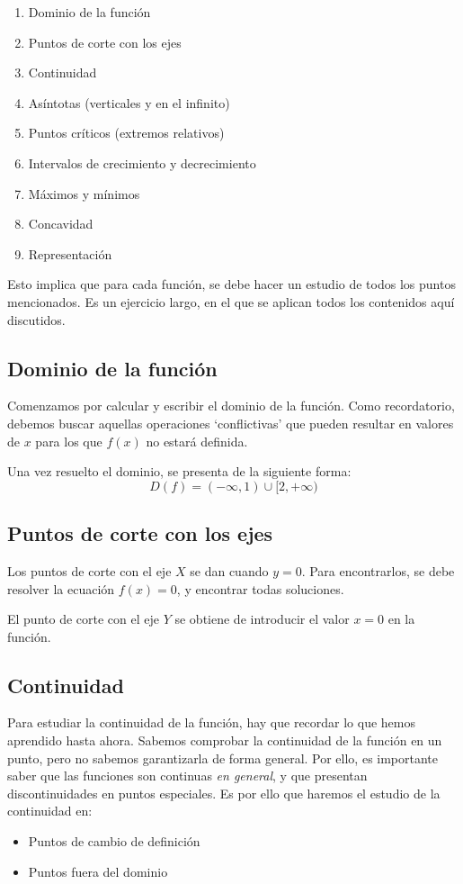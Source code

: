 \documentclass[sans]{apuntes}
\begin{document}
\begin{enumerate}
	\item Dominio de la función
	\item Puntos de corte con los ejes
	\item Continuidad
	\item Asíntotas (verticales y en el infinito)
	\item Puntos críticos (extremos relativos)
	\item Intervalos de crecimiento y decrecimiento
	\item Máximos y mínimos
	\item Concavidad
	\item Representación
\end{enumerate}

Esto implica que para cada función, se debe hacer un estudio de todos los puntos mencionados. Es un ejercicio largo, en el que se aplican todos los contenidos aquí discutidos.

\subsection{Dominio de la función}
Comenzamos por calcular y escribir el dominio de la función. Como recordatorio, debemos buscar aquellas operaciones `conflictivas' que pueden resultar en valores de $x$ para los que $f(x)$ no estará definida.
\par Una vez resuelto el dominio, se presenta de la siguiente forma:
\[D(f) = (-\infty, 1) \cup [2, +\infty)\]

\subsection{Puntos de corte con los ejes}
Los puntos de corte con el eje $X$ se dan cuando $y = 0$. Para encontrarlos, se debe resolver la ecuación $f(x) = 0$, y encontrar todas soluciones.
\par El punto de corte con el eje $Y$ se obtiene de introducir el valor $x = 0$ en la función.

\subsection{Continuidad}
Para estudiar la continuidad de la función, hay que recordar lo que hemos aprendido hasta ahora. Sabemos comprobar la continuidad de la función en un punto, pero no sabemos garantizarla de forma general. Por ello, es importante saber que las funciones son continuas \emph{en general}, y que presentan discontinuidades en puntos especiales. Es por ello que haremos el estudio de la continuidad en:
\begin{itemize}
	\item Puntos de cambio de definición
	\item Puntos fuera del dominio
\end{itemize}
\end{document}
